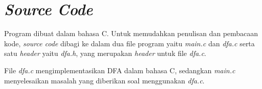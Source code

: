 \section{\textit{Source Code}}
Program dibuat dalam bahasa C. Untuk memudahkan penulisan dan pembacaan kode, \textit{source code} dibagi ke dalam dua file program yaitu \textit{main.c} dan \textit{dfa.c} serta satu \textit{header} yaitu \textit{dfa.h}, yang merupakan \textit{header} untuk file \textit{dfa.c}.

File \textit{dfa.c} mengimplementasikan DFA dalam bahasa C, sedangkan \textit{main.c} menyelesaikan masalah yang diberikan soal menggunakan \textit{dfa.c}.




